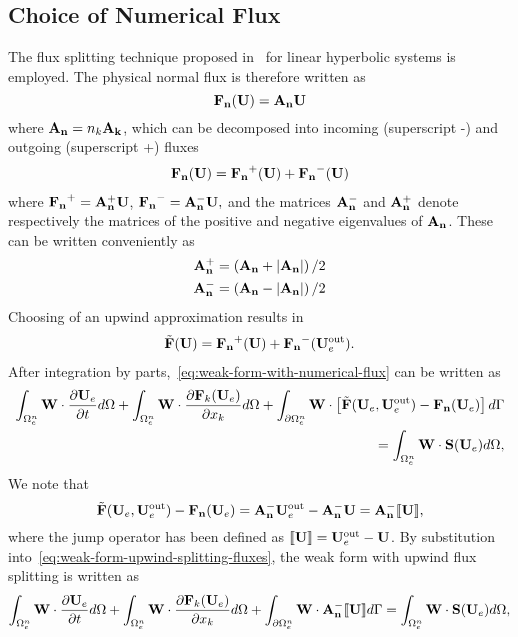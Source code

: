 \subsection{Choice of Numerical Flux}
The flux splitting technique proposed in~\cite{donea2003finite} for linear hyperbolic systems is employed.
The physical normal flux is therefore written as
$$
\mathbf{\mathbf{F}_n}(\mathbf{U}) = \mathbf{A}_\mathbf{n} \mathbf{U}
$$
where $\mathbf{A}_\mathbf{n} = n_{k} \mathbf{A}_\mathbf{k}$, which can be decomposed into incoming
(superscript -) and outgoing (superscript +) fluxes
\begin{align}
\mathbf{\mathbf{F}_n}(\mathbf{U}) = \mathbf{\mathbf{F}_n}^+(\mathbf{U}) + \mathbf{\mathbf{F}_n}^-(\mathbf{U})
\label{eq:phys-flux-splitting}
\end{align}
where $ \mathbf{\mathbf{F}_n}^+ = \mathbf{A}_\mathbf{n}^{+} \mathbf{U}$, $\mathbf{\mathbf{F}_n}^- = \mathbf{A}_\mathbf{n}^{-} \mathbf{U}, $ and the matrices $\mathbf{A}_\mathbf{n}^{-}$ and $\mathbf{A}_\mathbf{n}^{+}$ denote respectively the matrices of the positive and negative eigenvalues of $\mathbf{A}_\mathbf{n}$. These can be written conveniently as
\begin{align}
  \label{eq:AnMinus-AnPlus-Definition}
\mathbf{A}_\mathbf{n}^{+} &= \left( \mathbf{A}_\mathbf{n} + \left| \mathbf{A}_\mathbf{n} \right| \right) / 2   \\
\mathbf{A}_\mathbf{n}^{-} &= \left( \mathbf{A}_\mathbf{n} - \left| \mathbf{A}_\mathbf{n} \right| \right) / 2
\end{align}
Choosing of an upwind approximation\cite{chen2005high} results in
\begin{align}
\tilde{\mathbf{F}}(\mathbf{U}) = \mathbf{\mathbf{F}_n}^+(\mathbf{U}) + \mathbf{\mathbf{F}_n}^-(\mathbf{U}_e^{\textrm{out}}).
\label{eq:num-flux-splitting}
\end{align}
After integration by parts,~\eqref{eq:weak-form-with-numerical-flux} can be written as
\begin{align*}
\int_{\Omega_e^{n}} \mathbf{W} \cdot \frac{\partial \mathbf{U}_e}{\partial t} d\Omega  + \int_{\Omega_e^{n}} \mathbf{W} \cdot \frac{\partial \mathbf{F}_{k}(\mathbf{U}_e)}{\partial x_{k}} d\Omega + \int_{\partial \Omega_e^{n}} \mathbf{W} \cdot \left[ \tilde{\mathbf{F}}(\mathbf{U}_e,\mathbf{U}_e^{\textrm{out}}) - \mathbf{\mathbf{F}_n}(\mathbf{U}_e) \right] d\Gamma \\
= \int_{\Omega_e^{n}} \mathbf{W}  \cdot \mathbf{S}(\mathbf{U}_e) d\Omega, \label{eq:weak-form-upwind-splitting-fluxes}
\end{align*}
We note that %
\begin{equation}
  \tilde{\mathbf{F}}(\mathbf{U}_e,\mathbf{U}_e^{\textrm{out}}) - \mathbf{\mathbf{F}_n}(\mathbf{U}_e) = \mathbf{A}_\mathbf{n}^{-} \mathbf{U}_e^{\textrm{out}} - \mathbf{A}_\mathbf{n}^{-} \mathbf{U} = \mathbf{A}_\mathbf{n}^{-} \llbracket \mathbf{U} \rrbracket, \label{eq:AnMinusUderivation}
\end{equation}
where the jump operator has been defined as $\llbracket \mathbf{U} \rrbracket = \mathbf{U}_e^{\textrm{out}} - \mathbf{U}$. By substitution into~\eqref{eq:weak-form-upwind-splitting-fluxes}, the weak form with upwind flux splitting is written as
\begin{equation}
\int_{\Omega_e^{n}} \mathbf{W} \cdot \frac{\partial \mathbf{U}_e}{\partial t} d\Omega  + \int_{\Omega_e^{n}} \mathbf{W} \cdot \frac{\partial \mathbf{F}_{k}(\mathbf{U}_e)}{\partial x_{k}} d\Omega + \int_{\partial \Omega_e^{n}} \mathbf{W} \cdot \mathbf{A}_\mathbf{n}^{-} \llbracket \mathbf{U} \rrbracket d\Gamma = \int_{\Omega_e^{n}} \mathbf{W}  \cdot \mathbf{S}(\mathbf{U}_e) d\Omega,
\label{eq:weak-form-final}
\end{equation}

